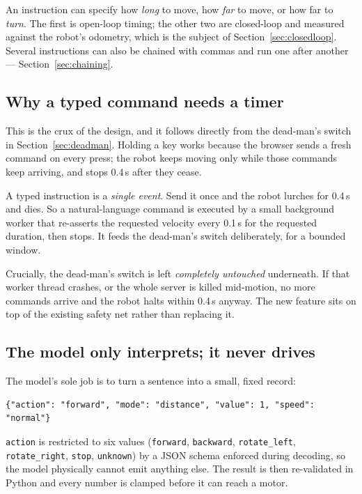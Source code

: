 \documentclass[11pt,a4paper]{article}
\newcommand{\code}[1]{\texttt{#1}}
\begin{document}
An instruction can specify how \emph{long} to move, how \emph{far} to move, or
how far to \emph{turn}. The first is open-loop timing; the other two are
closed-loop and measured against the robot's odometry, which is the subject of
Section~\ref{sec:closedloop}. Several instructions can also be chained with
commas and run one after another --- Section~\ref{sec:chaining}.

\subsection{Why a typed command needs a timer}
This is the crux of the design, and it follows directly from the dead-man's
switch in Section~\ref{sec:deadman}. Holding a key works because the browser
sends a fresh command on every press; the robot keeps moving only while those
commands keep arriving, and stops 0.4\,s after they cease.

A typed instruction is a \emph{single event}. Send it once and the robot lurches
for 0.4\,s and dies. So a natural-language command is executed by a small
background worker that re-asserts the requested velocity every 0.1\,s for the
requested duration, then stops. It feeds the dead-man's switch deliberately,
for a bounded window.

Crucially, the dead-man's switch is left \emph{completely untouched} underneath.
If that worker thread crashes, or the whole server is killed mid-motion, no more
commands arrive and the robot halts within 0.4\,s anyway. The new feature sits
on top of the existing safety net rather than replacing it.

\subsection{The model only interprets; it never drives}
The model's sole job is to turn a sentence into a small, fixed record:

\begin{lstlisting}[style=py]
{"action": "forward", "mode": "distance", "value": 1, "speed": "normal"}
\end{lstlisting}

\noindent
\code{action} is restricted to six values (\code{forward}, \code{backward},
\code{rotate\_left}, \code{rotate\_right}, \code{stop}, \code{unknown}) by a JSON
schema enforced during decoding, so the model physically cannot emit anything
else. The result is then re-validated in Python and every number is clamped
before it can reach a motor.
\end{document}
